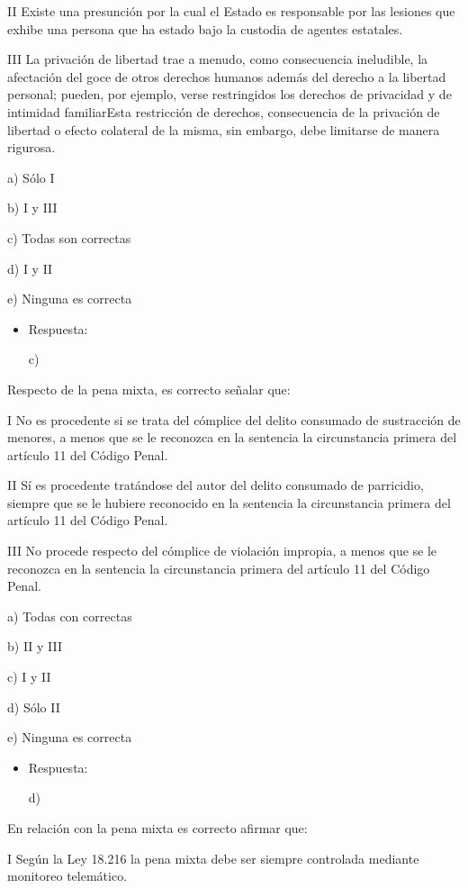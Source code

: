 \documentclass[letterpaper, 11pt]{article}
\begin{document}
II Existe una presunción por la cual el Estado es responsable por las
lesiones que exhibe una persona que ha estado bajo la custodia de
agentes estatales.

III La privación de libertad trae a menudo, como consecuencia
ineludible, la afectación del goce de otros derechos humanos además
del derecho a la libertad personal; pueden, por ejemplo, verse
restringidos los derechos de privacidad y de intimidad familiarEsta
restricción de derechos, consecuencia de la privación de libertad o
efecto colateral de la misma, sin embargo, debe limitarse de manera
rigurosa.


a) Sólo I

b) I y III

c) Todas son correctas

d) I y II

e) Ninguna es correcta

\begin{itemize}
\item Respuesta:

c)
\end{itemize}


Respecto de la pena mixta, es correcto señalar que:


I No es procedente si se trata del cómplice del delito consumado de
sustracción de menores, a menos que se le reconozca en la sentencia la
circunstancia primera del artículo 11 del Código Penal.

II Sí es procedente tratándose del autor del delito consumado de
parricidio, siempre que se le hubiere reconocido en la sentencia la
circunstancia primera del artículo 11 del Código Penal.

III No procede respecto del cómplice de violación impropia, a menos
que se le reconozca en la sentencia la circunstancia primera del
artículo 11 del Código Penal.

a) Todas con correctas

b) II y III

c) I y II

d) Sólo II

e) Ninguna es correcta

\begin{itemize}
\item Respuesta:

d)
\end{itemize}


En relación con la pena mixta es correcto afirmar que:


I Según la Ley 18.216 la pena mixta debe ser siempre controlada
mediante monitoreo telemático.
\end{document}
